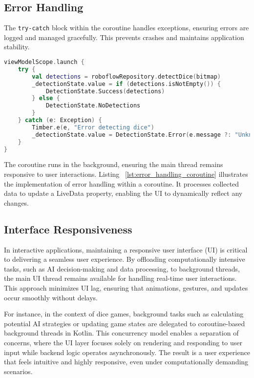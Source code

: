 \subsection{Error Handling}

The \texttt{try-catch} block within the coroutine handles exceptions, ensuring errors are logged and managed gracefully. This prevents crashes and maintains application stability.
\begin{lstlisting}[language=Kotlin, caption={Error Handling in Coroutines}, label=lst:error_handling_coroutine]
viewModelScope.launch {
    try {
        val detections = roboflowRepository.detectDice(bitmap)
        _detectionState.value = if (detections.isNotEmpty()) {
            DetectionState.Success(detections)
        } else {
            DetectionState.NoDetections
        }
    } catch (e: Exception) {
        Timber.e(e, "Error detecting dice")
        _detectionState.value = DetectionState.Error(e.message ?: "Unknown error")
    }
}
\end{lstlisting}

The coroutine runs in the background, ensuring the main thread remains responsive to user interactions. Listing ~\ref{lst:error_handling_coroutine} illustrates the implementation of error handling within a coroutine. It processes collected data to update a LiveData property, enabling the UI to dynamically reflect any changes.

\subsection{Interface Responsiveness}

In interactive applications, maintaining a responsive user interface (UI) is critical to delivering a seamless user experience. By offloading computationally intensive tasks, such as AI decision-making and data processing, to background threads, the main UI thread remains available for handling real-time user interactions. This approach minimizes UI lag, ensuring that animations, gestures, and updates occur smoothly without delays.

For instance, in the context of dice games, background tasks such as calculating potential AI strategies or updating game states are delegated to coroutine-based background threads in Kotlin. This concurrency model enables a separation of concerns, where the UI layer focuses solely on rendering and responding to user input while backend logic operates asynchronously. The result is a user experience that feels intuitive and highly responsive, even under computationally demanding scenarios.

